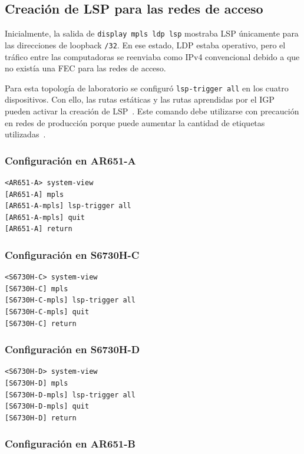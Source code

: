 \subsection{Creación de LSP para las redes de acceso}

Inicialmente, la salida de \texttt{display mpls ldp lsp} mostraba LSP
únicamente para las direcciones de loopback \texttt{/32}. En ese estado,
LDP estaba operativo, pero el tráfico entre las computadoras se reenviaba como
IPv4 convencional debido a que no existía una FEC para las redes de acceso.

Para esta topología de laboratorio se configuró \texttt{lsp-trigger all} en
los cuatro dispositivos. Con ello, las rutas estáticas y las rutas aprendidas
por el IGP pueden activar la creación de LSP~\cite{huawei-politica-lsp}. Este comando debe utilizarse con
precaución en redes de producción porque puede aumentar la cantidad de
etiquetas utilizadas~\cite{huawei-lsp-trigger-ipv4}.

\subsubsection{Configuración en AR651-A}

\begin{lstlisting}[style=terminal]
<AR651-A> system-view
[AR651-A] mpls
[AR651-A-mpls] lsp-trigger all
[AR651-A-mpls] quit
[AR651-A] return
\end{lstlisting}

\subsubsection{Configuración en S6730H-C}

\begin{lstlisting}[style=terminal]
<S6730H-C> system-view
[S6730H-C] mpls
[S6730H-C-mpls] lsp-trigger all
[S6730H-C-mpls] quit
[S6730H-C] return
\end{lstlisting}

\subsubsection{Configuración en S6730H-D}

\begin{lstlisting}[style=terminal]
<S6730H-D> system-view
[S6730H-D] mpls
[S6730H-D-mpls] lsp-trigger all
[S6730H-D-mpls] quit
[S6730H-D] return
\end{lstlisting}

\subsubsection{Configuración en AR651-B}

